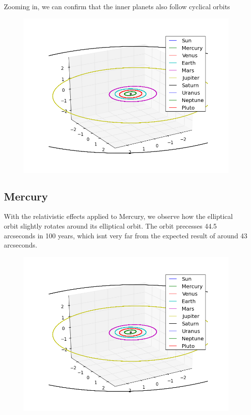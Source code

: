 \documentclass[10pt]{article}
\begin{document}
\begin{multicols}{2}
Zooming in, we can confirm that the inner planets also follow cyclical
orbits


\begin{figure}[H]
    \centering
    \includegraphics[width=1.0\linewidth]{../results/full_system_inner.png}
    \label{fig:name}
\end{figure}





\subsection{Mercury}
With the relativistic effects applied to Mercury, we observe how the
elliptical orbit slightly rotates around its elliptical orbit. The orbit
precesses 44.5 arcseconds in 100 years, which isnt very far from the
expected result of around 43 arcseconds.

\begin{figure}[H]
    \centering
    \includegraphics[width=1.0\linewidth]{../results/full_system_inner.png}
    \label{fig:name}
\end{figure}


\end{multicols}
\end{document}
